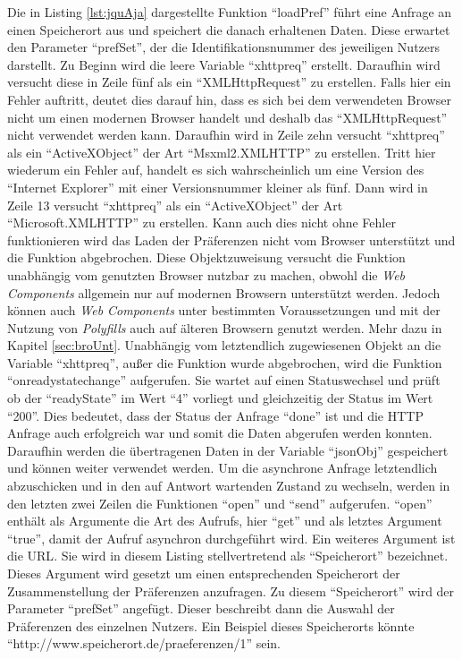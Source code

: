 \documentclass[12pt, paper=a4, bibtotoc, toc=listof, headsepline=true, numbers=endperiod]{scrreprt}
\begin{document}
Die in Listing \ref{lst:jquAja} dargestellte Funktion \enquote{loadPref} führt eine Anfrage an einen Speicherort aus und speichert die danach erhaltenen Daten. Diese erwartet den Parameter \enquote{prefSet}, der die Identifikationsnummer des jeweiligen Nutzers darstellt. Zu Beginn wird die leere Variable \enquote{xhttpreq} erstellt. Daraufhin wird versucht diese in Zeile fünf als ein \enquote{XMLHttpRequest} zu erstellen. Falls hier ein Fehler auftritt, deutet dies darauf hin, dass es sich bei dem verwendeten Browser nicht um einen modernen Browser handelt und deshalb das \enquote{XMLHttpRequest} nicht verwendet werden kann. Daraufhin wird in Zeile zehn versucht \enquote{xhttpreq} als ein \enquote{ActiveXObject} der Art \enquote{Msxml2.XMLHTTP} zu erstellen. Tritt hier wiederum ein Fehler auf, handelt es sich wahrscheinlich um eine Version des \enquote{Internet Explorer} mit einer Versionsnummer kleiner als fünf. Dann wird in Zeile 13 versucht \enquote{xhttpreq} als ein \enquote{ActiveXObject} der Art \enquote{Microsoft.XMLHTTP} zu erstellen. Kann auch dies nicht ohne Fehler funktionieren wird das Laden der Präferenzen nicht vom Browser unterstützt und die Funktion abgebrochen. Diese Objektzuweisung versucht die Funktion unabhängig vom genutzten Browser nutzbar zu machen, obwohl die \emph{Web Components} allgemein nur auf modernen Browsern unterstützt werden. Jedoch können auch \emph{Web Components} unter bestimmten Voraussetzungen und mit der Nutzung von \emph{Polyfills} auch auf älteren Browsern genutzt werden. Mehr dazu in Kapitel \ref{sec:broUnt}. Unabhängig vom letztendlich zugewiesenen Objekt an die Variable \enquote{xhttpreq}, außer die Funktion wurde abgebrochen,  wird die Funktion \enquote{onreadystatechange} aufgerufen. Sie wartet auf einen Statuswechsel und prüft ob der \enquote{readyState} im Wert \enquote{4} vorliegt und gleichzeitig der Status im Wert \enquote{200}. Dies bedeutet, dass der Status der Anfrage \enquote{done} ist und die \ac{HTTP} Anfrage auch erfolgreich war und somit die Daten abgerufen werden konnten. Daraufhin werden die übertragenen Daten in der Variable \enquote{jsonObj} gespeichert und können weiter verwendet werden. Um die asynchrone Anfrage letztendlich abzuschicken und in den auf Antwort wartenden Zustand zu wechseln, werden in den letzten zwei Zeilen die Funktionen \enquote{open} und \enquote{send} aufgerufen. \enquote{open} enthält als Argumente die Art des Aufrufs, hier \enquote{get} und als letztes Argument \enquote{true}, damit der Aufruf asynchron durchgeführt wird. Ein weiteres Argument ist die \ac{URL}. Sie wird in diesem Listing stellvertretend als \enquote{Speicherort} bezeichnet. Dieses Argument wird gesetzt um einen entsprechenden Speicherort der Zusammenstellung der Präferenzen anzufragen. Zu diesem \enquote{Speicherort} wird der Parameter \enquote{prefSet} angefügt. Dieser beschreibt dann die Auswahl der Präferenzen des einzelnen Nutzers. Ein Beispiel dieses
\newline 
Speicherorts könnte \enquote{http://www.speicherort.de/praeferenzen/1} sein\cite{xmlhttp}.
		
\end{document}
